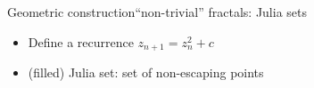 \documentclass[xcolor=x11names,compress,professionalfonts]{beamer}
\renewcommand{\(}{\begin{columns}}
\renewcommand{\)}{\end{columns}}
\newcommand{\<}[1]{\begin{column}{#1}}
\renewcommand{\>}{\end{column}}
\begin{document}
\begin{frame}{Geometric construction}{``non-trivial'' fractals: Julia sets}
\begin{itemize}
	\item Define a recurrence $z_{n+1} = z_n^2 + c$
	\item (filled) Julia set: set of non-escaping points
\end{itemize}

\centering
{}
    
\end{frame}
\end{document}
